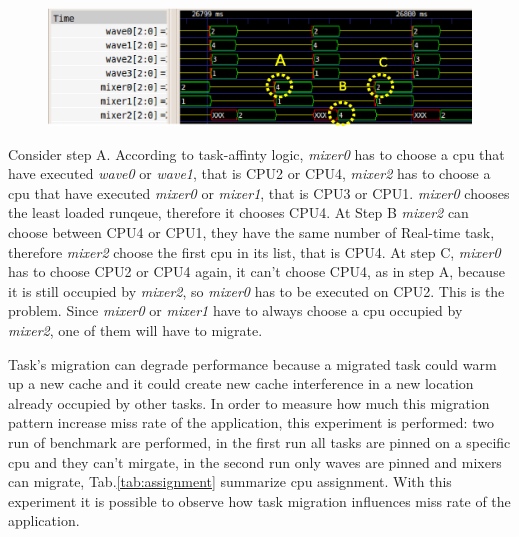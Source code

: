 \begin{figure}[htbp]
\centering
\includegraphics[width=\widefigure]{images/migr_i7.eps}
\caption{}
\label{fig:migr_pat}
\end{figure}

\newpage
Consider step A. According to task-affinty logic, \textit{mixer0} has to choose a cpu that have executed \textit{wave0} or \textit{wave1}, that is
CPU2 or CPU4, \textit{mixer2} has to choose a cpu that have executed \textit{mixer0} or \textit{mixer1}, that is CPU3 or CPU1. \textit{mixer0} chooses the 
least loaded runqeue, therefore it chooses CPU4. At Step B \textit{mixer2} can choose between CPU4 or CPU1, they have the same number of Real-time task, 
therefore \textit{mixer2} choose the first cpu in its list, that is CPU4. At step C, \textit{mixer0} has to choose CPU2 or CPU4 again, it can't choose CPU4,
as in step A, because it is still occupied by \textit{mixer2}, so \textit{mixer0} has to be executed on CPU2. This is the problem. Since \textit{mixer0} or 
\textit{mixer1} have to always choose a cpu occupied by \textit{mixer2}, one of them will have to migrate.

Task's migration can degrade performance because a migrated task could warm up a new cache and it could create new cache interference in a new location 
already occupied by other tasks. In order to measure how much this migration pattern increase miss rate of the application, this experiment is performed: 
two run of benchmark are performed, in the first run all tasks are pinned on a specific cpu and they can't mirgate, in the second run only waves are pinned
and mixers can migrate, Tab.\ref{tab:assignment} summarize cpu assignment. With this experiment it is possible to observe how task migration influences 
miss rate of the application.
\newpage

